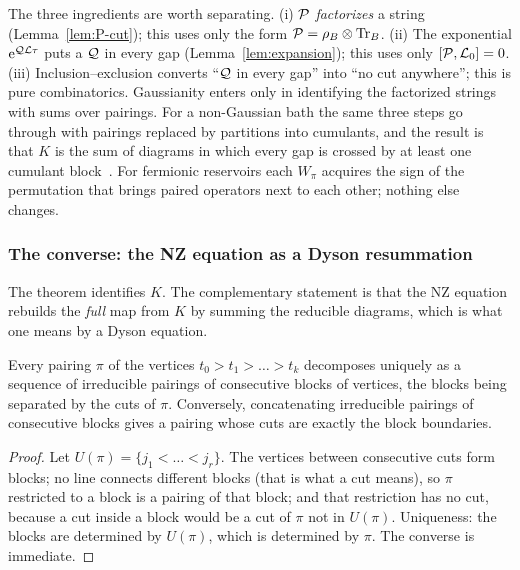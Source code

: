 \begin{remark}
The three ingredients are worth separating.
(i) $\mathcal{P}$ \emph{factorizes} a string (Lemma~\ref{lem:P-cut}); this uses only the form $\mathcal{P}=\rho_{B}\otimes\operatorname{Tr}_B$.
(ii) The exponential $\mathrm{e}^{\mathcal{Q}\mathcal{L}\tau}$ puts a $\mathcal{Q}$ in every gap (Lemma~\ref{lem:expansion}); this uses only $[\mathcal{P},\mathcal{L}_0]=0$.
(iii) Inclusion--exclusion converts ``$\mathcal{Q}$ in every gap'' into ``no cut anywhere''; this is pure combinatorics.
Gaussianity enters only in identifying the factorized strings with sums over pairings.
For a non-Gaussian bath the same three steps go through with pairings replaced by partitions into cumulants, and the result is that $K$ is the sum of diagrams in which every gap is crossed by at least one cumulant block~\cite{Schoeller2009}.
For fermionic reservoirs each $W_\pi$ acquires the sign of the permutation that brings paired operators next to each other; nothing else changes.
\end{remark}

\subsubsection{The converse: the NZ equation as a Dyson resummation}

The theorem identifies $K$.
The complementary statement is that the NZ equation rebuilds the \emph{full} map from $K$ by summing the reducible diagrams, which is what one means by a Dyson equation.

\begin{proposition}\label{prop:blocks}
Every pairing $\pi$ of the vertices $t_0>t_1>\dots>t_k$ decomposes uniquely as a sequence of irreducible pairings of consecutive blocks of vertices, the blocks being separated by the cuts of $\pi$.
Conversely, concatenating irreducible pairings of consecutive blocks gives a pairing whose cuts are exactly the block boundaries.
\end{proposition}
\begin{proof}
Let $U(\pi)=\{j_1<\dots<j_r\}$.
The vertices between consecutive cuts form blocks; no line connects different blocks (that is what a cut means), so $\pi$ restricted to a block is a pairing of that block; and that restriction has no cut, because a cut inside a block would be a cut of $\pi$ not in $U(\pi)$.
Uniqueness: the blocks are determined by $U(\pi)$, which is determined by $\pi$.
The converse is immediate.
\end{proof}

